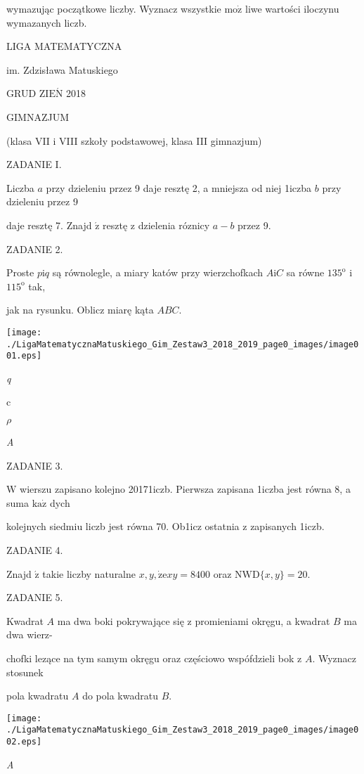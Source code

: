 \documentclass[a4paper,12pt]{article}
\begin{document}
wymazując początkowe liczby. Wyznacz wszystkie $\mathrm{m}\mathrm{o}\dot{\mathrm{z}}$ liwe wartości iloczynu wymazanych liczb.






LIGA MATEMATYCZNA

im. Zdzisława Matuskiego

GRUD Z$\mathrm{I}\mathrm{E}\acute{\mathrm{N}}$ 2018

GIMNAZJUM

(klasa VII i VIII szkoły podstawowej, klasa III gimnazjum)

ZADANIE I.

Liczba $a$ przy dzieleniu przez 9 daje resztę 2, a mniejsza od niej 1iczba $b$ przy dzieleniu przez 9

daje resztę 7. Znajd $\acute{\mathrm{z}}$ resztę z dzielenia róznicy $a-b$ przez 9.

ZADANIE 2.

Proste $p\mathrm{i}q$ są równolegle, a miary katów przy wierzchofkach $A\mathrm{i}C$ sa równe $135^{\mathrm{o}}$ i $115^{\mathrm{o}}$ tak,

jak na rysunku. Oblicz miarę kąta $ABC.$
\begin{center}
\texttt{[image: ./LigaMatematycznaMatuskiego\_Gim\_Zestaw3\_2018\_2019\_page0\_images/image001.eps]}
\end{center}
{\it q}

c

$\rho$

{\it A}

ZADANIE 3.

$\mathrm{W}$ wierszu zapisano kolejno 20171iczb. Pierwsza zapisana 1iczba jest równa 8, a suma $\mathrm{k}\mathrm{a}\dot{\mathrm{z}}$ dych

kolejnych siedmiu liczb jest równa 70. Ob1icz ostatnia z zapisanych 1iczb.

ZADANIE 4.

Znajd $\acute{\mathrm{z}}$ takie liczby naturalne $x, y, \dot{\mathrm{z}}\mathrm{e}xy=8400$ oraz $\mathrm{N}\mathrm{W}\mathrm{D}\{x,y\}=20.$

ZADANIE 5.

Kwadrat $A$ ma dwa boki pokrywające się z promieniami okręgu, a kwadrat $B$ ma dwa wierz-

chofki lezące na tym samym okręgu oraz częściowo wspófdzieli bok z $A$. Wyznacz stosunek

pola kwadratu $A$ do pola kwadratu $B.$
\begin{center}
\texttt{[image: ./LigaMatematycznaMatuskiego\_Gim\_Zestaw3\_2018\_2019\_page0\_images/image002.eps]}
\end{center}
{\it A}
\end{document}
